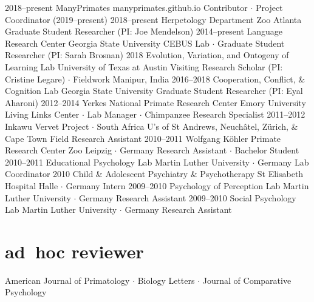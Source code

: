 \documentclass[]{friggeri-cv}
\begin{document}
\begin{entrylist}
  \entry
    {2018--present}
    {ManyPrimates}
    {manyprimates.github.io}
    {Contributor $\cdot$ Project Coordinator (2019--present)}
  \entry
    {2018--present}
    {Herpetology Department}
    {Zoo Atlanta}
    {Graduate Student Researcher (PI: Joe Mendelson)}
  \entry
    {2014--present}
    {Language Research Center}
    {Georgia State University}
    {CEBUS Lab $\cdot$ Graduate Student Researcher (PI: Sarah Brosnan)}
  \entry
    {2018}
    {Evolution, Variation, and Ontogeny of Learning Lab}
    {University of Texas at Austin}
    {Visiting Research Scholar (PI: Cristine Legare) $\cdot$ Fieldwork Manipur, India}
  \entry
    {2016--2018}
    {Cooperation, Conflict, \& Cognition Lab}
    {Georgia State University}
    {Graduate Student Researcher (PI: Eyal Aharoni)}
  \entry
    {2012--2014}
    {Yerkes National Primate Research Center}
    {Emory University}
    {Living Links Center $\cdot$ Lab Manager $\cdot$ Chimpanzee Research Specialist}
  \entry
    {2011--2012}
    {Inkawu Vervet Project $\cdot$ South Africa}
    {U's of St Andrews, Neuch\^{a}tel, Z\"urich, \& Cape Town}
    {Field Research Assistant}
  \entry
    {2010--2011}
    {Wolfgang K\"{o}hler Primate Research Center}
    {Zoo Leipzig $\cdot$ Germany}
    {Research Assistant $\cdot$ Bachelor Student}
  \entry
    {2010--2011}
    {Educational Psychology Lab}
    {Martin Luther University $\cdot$ Germany}
    {Lab Coordinator}
  \entry
    {2010}
    {Child \& Adolescent Psychiatry \& Psychotherapy}
    {St Elisabeth Hospital Halle $\cdot$ Germany}
    {Intern}
  \entry
    {2009--2010}
    {Psychology of Perception Lab}
    {Martin Luther University $\cdot$ Germany}
    {Research Assistant}
  \entry
    {2009--2010}
    {Social Psychology Lab}
    {Martin Luther University $\cdot$ Germany}
    {Research Assistant}
\end{entrylist}


\section{ad~hoc reviewer}
    American Journal of Primatology $\cdot$ Biology Letters $\cdot$ Journal of Comparative Psychology \\[.5cm]

\end{document}
